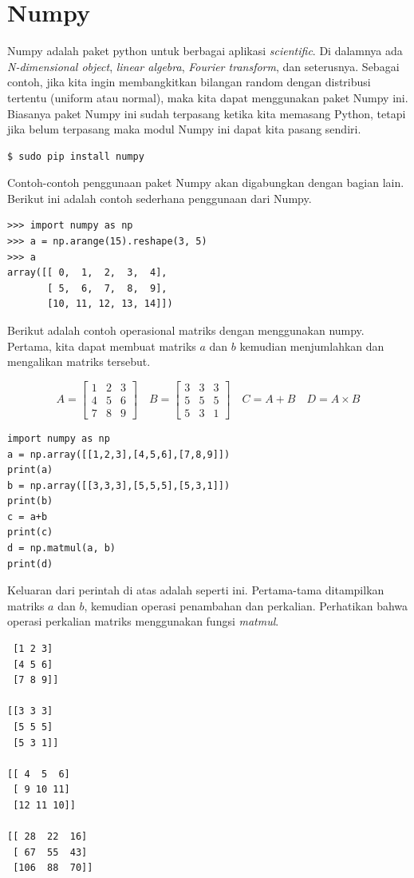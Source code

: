\section{Numpy}
Numpy adalah paket python untuk berbagai aplikasi {\em scientific}.
Di dalamnya ada {\em N-dimensional object}, {\em linear algebra},
{\em Fourier transform}, dan seterusnya.
Sebagai contoh, jika kita ingin membangkitkan bilangan random dengan 
distribusi tertentu (uniform atau normal), maka kita dapat menggunakan 
paket Numpy ini.
Biasanya paket Numpy ini sudah terpasang ketika kita memasang Python,
tetapi jika belum terpasang maka modul Numpy ini dapat kita pasang sendiri.

\begin{verbatim}
$ sudo pip install numpy
\end{verbatim}

Contoh-contoh penggunaan paket Numpy akan digabungkan dengan bagian lain.
Berikut ini adalah contoh sederhana penggunaan dari Numpy.

\begin{verbatim}
>>> import numpy as np
>>> a = np.arange(15).reshape(3, 5)
>>> a
array([[ 0,  1,  2,  3,  4],
       [ 5,  6,  7,  8,  9],
       [10, 11, 12, 13, 14]])
\end{verbatim}

Berikut adalah contoh operasional matriks dengan menggunakan numpy.
Pertama, kita dapat membuat matriks $a$ dan $b$ kemudian menjumlahkan
dan mengalikan matriks tersebut.

\begin{equation*}
   A = 
   \begin{bmatrix}
   1 & 2 & 3 \\
   4 & 5 & 6 \\
   7 & 8 & 9
   \end{bmatrix}
   \quad
   B =
   \begin{bmatrix}
   3 & 3 & 3 \\
   5 & 5 & 5 \\
   5 & 3 & 1
   \end{bmatrix}
   \quad
   C = A+B
   \quad
   D = A \times B
\end{equation*}


\begin{verbatim}
import numpy as np
a = np.array([[1,2,3],[4,5,6],[7,8,9]])
print(a)
b = np.array([[3,3,3],[5,5,5],[5,3,1]])
print(b)
c = a+b
print(c)
d = np.matmul(a, b)
print(d)
\end{verbatim}

Keluaran dari perintah di atas adalah seperti ini. Pertama-tama ditampilkan
matriks $a$ dan $b$, kemudian operasi penambahan dan perkalian.
Perhatikan bahwa operasi perkalian matriks menggunakan fungsi {\em matmul}.
\begin{verbatim}
 [1 2 3]
 [4 5 6]
 [7 8 9]]

[[3 3 3]
 [5 5 5]
 [5 3 1]]

[[ 4  5  6]
 [ 9 10 11]
 [12 11 10]]

[[ 28  22  16]
 [ 67  55  43]
 [106  88  70]]
\end{verbatim}

